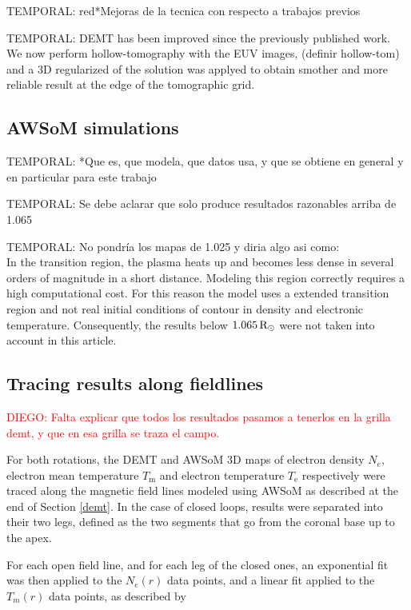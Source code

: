 \documentclass[namedreferences]{solarphysics}
\newcommand{\mrsun}{{\rm R_\odot}}
\def\diego#1{\textcolor{red}{DIEGO: #1}}
\def\temp#1{\textcolor{mygray}{TEMPORAL: #1}}
\begin{document}
\begin{article}
\temp{red}{*Mejoras de la tecnica con respecto a trabajos previos}

\temp{DEMT has been improved since the previously published work. We now perform hollow-tomography with the EUV images, (definir hollow-tom) and a 3D regularized of the solution was applyed to obtain smother and more reliable result at the edge of the tomographic grid.}



\subsection{AWSoM simulations}\label{awsom} 
\temp{*Que es, que modela, que datos usa, y que se obtiene en general y en particular para este trabajo}

\temp{Se debe aclarar que solo produce resultados razonables arriba de 1.065}

\temp{No pondría los mapas de 1.025 y diria algo asi como:\\}
In the transition region, the plasma heats up and becomes less dense in several orders of magnitude in a short distance. Modeling this region correctly requires a high computational cost. For this reason the model uses a extended transition region and not real initial conditions of contour in density and electronic temperature. Consequently, the results below $1.065\,\mrsun$ were not taken into account in this article.

\subsection{Tracing results along fieldlines}\label{trace} 

\diego{Falta explicar que todos los resultados pasamos a tenerlos en la grilla demt, y que en esa grilla se traza el campo.}

For both rotations, the DEMT and AWSoM 3D maps of electron density $N_e$, electron mean temperature $T_\textrm{m}$ and electron temperature $T_\textrm{e}$ respectively were traced along the magnetic field lines modeled using AWSoM as described at the end of Section \ref{demt}. In the case of closed loops, results were separated into their two legs, defined as the two segments that go from the coronal base up to the apex.

For each open field line, and for each leg of the closed ones, an exponential fit was then applied to the $N_e(r)$ data points, and a linear fit applied to the $T_m(r)$ data points, as described by


\end{article}
\end{document}
